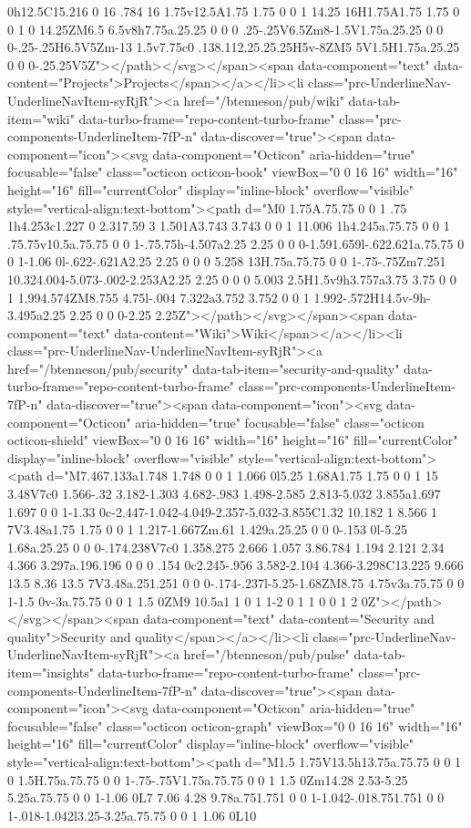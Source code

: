 {{{0h12.5C15.216 0 16 .784 16 1.75v12.5A1.75 1.75 0 0 1 14.25 16H1.75A1.75 1.75 0 0 1 0 14.25ZM6.5 6.5v8h7.75a.25.25 0 0 0 .25-.25V6.5Zm8-1.5V1.75a.25.25 0 0 0-.25-.25H6.5V5Zm-13 1.5v7.75c0 .138.112.25.25.25H5v-8ZM5 5V1.5H1.75a.25.25 0 0 0-.25.25V5Z"></path></svg></span><span data-component="text" data-content="Projects">Projects</span></a></li><li class="prc-UnderlineNav-UnderlineNavItem-syRjR"><a href="/btenneson/pub/wiki" data-tab-item="wiki" data-turbo-frame="repo-content-turbo-frame" class="prc-components-UnderlineItem-7fP-n" data-discover="true"><span data-component="icon"><svg data-component="Octicon" aria-hidden="true" focusable="false" class="octicon octicon-book" viewBox="0 0 16 16" width="16" height="16" fill="currentColor" display="inline-block" overflow="visible" style="vertical-align:text-bottom"><path d="M0 1.75A.75.75 0 0 1 .75 1h4.253c1.227 0 2.317.59 3 1.501A3.743 3.743 0 0 1 11.006 1h4.245a.75.75 0 0 1 .75.75v10.5a.75.75 0 0 1-.75.75h-4.507a2.25 2.25 0 0 0-1.591.659l-.622.621a.75.75 0 0 1-1.06 0l-.622-.621A2.25 2.25 0 0 0 5.258 13H.75a.75.75 0 0 1-.75-.75Zm7.251 10.324.004-5.073-.002-2.253A2.25 2.25 0 0 0 5.003 2.5H1.5v9h3.757a3.75 3.75 0 0 1 1.994.574ZM8.755 4.75l-.004 7.322a3.752 3.752 0 0 1 1.992-.572H14.5v-9h-3.495a2.25 2.25 0 0 0-2.25 2.25Z"></path></svg></span><span data-component="text" data-content="Wiki">Wiki</span></a></li><li class="prc-UnderlineNav-UnderlineNavItem-syRjR"><a href="/btenneson/pub/security" data-tab-item="security-and-quality" data-turbo-frame="repo-content-turbo-frame" class="prc-components-UnderlineItem-7fP-n" data-discover="true"><span data-component="icon"><svg data-component="Octicon" aria-hidden="true" focusable="false" class="octicon octicon-shield" viewBox="0 0 16 16" width="16" height="16" fill="currentColor" display="inline-block" overflow="visible" style="vertical-align:text-bottom"><path d="M7.467.133a1.748 1.748 0 0 1 1.066 0l5.25 1.68A1.75 1.75 0 0 1 15 3.48V7c0 1.566-.32 3.182-1.303 4.682-.983 1.498-2.585 2.813-5.032 3.855a1.697 1.697 0 0 1-1.33 0c-2.447-1.042-4.049-2.357-5.032-3.855C1.32 10.182 1 8.566 1 7V3.48a1.75 1.75 0 0 1 1.217-1.667Zm.61 1.429a.25.25 0 0 0-.153 0l-5.25 1.68a.25.25 0 0 0-.174.238V7c0 1.358.275 2.666 1.057 3.86.784 1.194 2.121 2.34 4.366 3.297a.196.196 0 0 0 .154 0c2.245-.956 3.582-2.104 4.366-3.298C13.225 9.666 13.5 8.36 13.5 7V3.48a.251.251 0 0 0-.174-.237l-5.25-1.68ZM8.75 4.75v3a.75.75 0 0 1-1.5 0v-3a.75.75 0 0 1 1.5 0ZM9 10.5a1 1 0 1 1-2 0 1 1 0 0 1 2 0Z"></path></svg></span><span data-component="text" data-content="Security and quality">Security and quality</span></a></li><li class="prc-UnderlineNav-UnderlineNavItem-syRjR"><a href="/btenneson/pub/pulse" data-tab-item="insights" data-turbo-frame="repo-content-turbo-frame" class="prc-components-UnderlineItem-7fP-n" data-discover="true"><span data-component="icon"><svg data-component="Octicon" aria-hidden="true" focusable="false" class="octicon octicon-graph" viewBox="0 0 16 16" width="16" height="16" fill="currentColor" display="inline-block" overflow="visible" style="vertical-align:text-bottom"><path d="M1.5 1.75V13.5h13.75a.75.75 0 0 1 0 1.5H.75a.75.75 0 0 1-.75-.75V1.75a.75.75 0 0 1 1.5 0Zm14.28 2.53-5.25 5.25a.75.75 0 0 1-1.06 0L7 7.06 4.28 9.78a.751.751 0 0 1-1.042-.018.751.751 0 0 1-.018-1.042l3.25-3.25a.75.75 0 0 1 1.06 0L10 }}}
